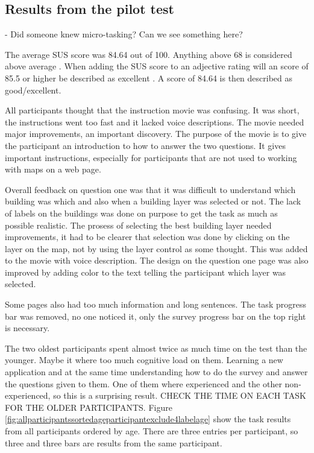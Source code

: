 \subsection{Results from the pilot test}

- Did someone knew micro-tasking? Can we see something here?

The average SUS score was 84.64 out of 100. Anything above 68 is considered above average \citep{Affairs2013}. When adding the SUS score to an adjective rating will an score of 85.5 or higher be described as excellent \citep{Bangor2009}. A score of 84.64 is then described as good/excellent. 

All participants thought that the instruction movie was confusing. It was short, the instructions went too fast and it lacked voice descriptions. The movie needed major improvements, an important discovery. The purpose of the movie is to give the participant an introduction to how to answer the two questions. It gives important instructions, especially for participants that are not used to working with maps on a web page. 

Overall feedback on question one was that it was difficult to understand which building was which and also when a building layer was selected or not. The lack of labels on the buildings was done on purpose to get the task as much as possible realistic. The prosess of selecting the best building layer needed improvements, it had to be clearer that selection was done by clicking on the layer on the map, not by using the layer control as some thought. This was added to the movie with voice description. The design on the question one page was also improved by adding color to the text telling the participant which layer was selected. 
 
Some pages also had too much information and long sentences. The task progress bar was removed, no one noticed it, only the survey progress bar on the top right is necessary. 

The two oldest participants spent almost twice as much time on the test than the younger. Maybe it where too much cognitive load on them. Learning a new application and at the same time understanding how to do the survey and answer the questions given to them. One of them where experienced and the other non-experienced, so this is a surprising result.  CHECK THE TIME ON EACH TASK FOR THE OLDER PARTICIPANTS. Figure \ref{fig:allparticipantssortedageparticipantexclude4labelage} show the task results from all participants ordered by age. There are three entries per participant, so three and three bars are results from the same participant. \newline

